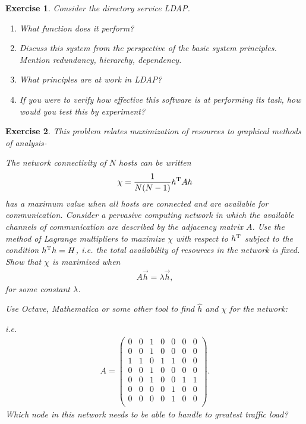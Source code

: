 \documentclass{book}
\newtheorem{exercise}{Exercise}
\def\beq{\begin{eqnarray}}
\def\eeq{\end{eqnarray}}
\begin{document}
\begin{exercise} 
Consider the directory service LDAP. 
\begin{enumerate}
\item What function does it perform?

\item Discuss this system from the perspective of the basic system principles.
Mention redundancy, hierarchy, dependency. 

\item What principles are at
work in LDAP? 

\item If you were to verify how effective this software is
at performing its task, how would you test this by experiment?
\end{enumerate}
\end{exercise}
\begin{solution}
\end{solution}


\begin{exercise}
This problem relates maximization of resources to graphical methods of analysis-

The network connectivity of $N$ hosts can be written
\beq
\chi = \frac{1}{N(N-1)} h^{\rm T} A h
\eeq
has a maximum value when all hosts are connected and are available for
communication. Consider a pervasive computing network in which the available
channels of communication are described by the adjacency matrix $A$.
Use the method of Lagrange multipliers to maximize $\chi$ with respect
 to $h^{\rm T}$ subject to the condition $h^{\rm T} h = H$, i.e. the
total availability of resources in the network is fixed.
Show that $\chi$ is maximized when
\beq
A \vec h = \lambda \vec h,
\eeq
for some constant $\lambda$.

Use Octave, Mathematica or some other tool to find $\hat h$ and $\chi$
for the network:
\begin{figure}[ht]
\end{figure}
i.e.
\beq
A = \left(
\begin{array}{ccccccc}
0 & 0 & 1 & 0 & 0 & 0 & 0\\
0 & 0 & 1 & 0 & 0 & 0 & 0\\
1 & 1 & 0 & 1 & 1 & 0 & 0\\
0 & 0 & 1 & 0 & 0 & 0 & 0\\
0 & 0 & 1 & 0 & 0 & 1 & 1\\
0 & 0 & 0 & 0 & 1 & 0 & 0\\
0 & 0 & 0 & 0 & 1 & 0 & 0\\
\end{array}
\right).
\eeq
Which node in this network needs to be able to handle to greatest traffic load?

\end{exercise}
\begin{solution}
\end{solution}
\end{document}

